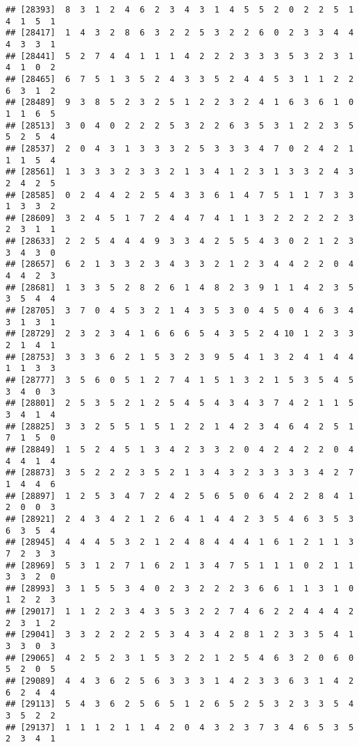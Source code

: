 \documentclass[
]{article}
\begin{document}
\begin{verbatim}
## [28393]  8  3  1  2  4  6  2  3  4  3  1  4  5  5  2  0  2  2  5  1  4  1  5  1
## [28417]  1  4  3  2  8  6  3  2  2  5  3  2  2  6  0  2  3  3  4  4  4  3  3  1
## [28441]  5  2  7  4  4  1  1  1  4  2  2  2  3  3  3  5  3  2  3  1  4  1  0  2
## [28465]  6  7  5  1  3  5  2  4  3  3  5  2  4  4  5  3  1  1  2  2  6  3  1  2
## [28489]  9  3  8  5  2  3  2  5  1  2  2  3  2  4  1  6  3  6  1  0  1  1  6  5
## [28513]  3  0  4  0  2  2  2  5  3  2  2  6  3  5  3  1  2  2  3  5  5  2  5  4
## [28537]  2  0  4  3  1  3  3  3  2  5  3  3  3  4  7  0  2  4  2  1  1  1  5  4
## [28561]  1  3  3  3  2  3  3  2  1  3  4  1  2  3  1  3  3  2  4  3  2  4  2  5
## [28585]  0  2  4  4  2  2  5  4  3  3  6  1  4  7  5  1  1  7  3  3  1  3  3  2
## [28609]  3  2  4  5  1  7  2  4  4  7  4  1  1  3  2  2  2  2  2  3  2  3  1  1
## [28633]  2  2  5  4  4  4  9  3  3  4  2  5  5  4  3  0  2  1  2  3  3  4  3  0
## [28657]  6  2  1  3  3  2  3  4  3  3  2  1  2  3  4  4  2  2  0  4  4  4  2  3
## [28681]  1  3  3  5  2  8  2  6  1  4  8  2  3  9  1  1  4  2  3  5  3  5  4  4
## [28705]  3  7  0  4  5  3  2  1  4  3  5  3  0  4  5  0  4  6  3  4  3  1  3  1
## [28729]  2  3  2  3  4  1  6  6  6  5  4  3  5  2  4 10  1  2  3  3  2  1  4  1
## [28753]  3  3  3  6  2  1  5  3  2  3  9  5  4  1  3  2  4  1  4  4  1  1  3  3
## [28777]  3  5  6  0  5  1  2  7  4  1  5  1  3  2  1  5  3  5  4  5  3  4  0  3
## [28801]  2  5  3  5  2  1  2  5  4  5  4  3  4  3  7  4  2  1  1  5  3  4  1  4
## [28825]  3  3  2  5  5  1  5  1  2  2  1  4  2  3  4  6  4  2  5  1  7  1  5  0
## [28849]  1  5  2  4  5  1  3  4  2  3  3  2  0  4  2  4  2  2  0  4  4  4  1  4
## [28873]  3  5  2  2  2  3  5  2  1  3  4  3  2  3  3  3  3  4  2  7  1  4  4  6
## [28897]  1  2  5  3  4  7  2  4  2  5  6  5  0  6  4  2  2  8  4  1  2  0  0  3
## [28921]  2  4  3  4  2  1  2  6  4  1  4  4  2  3  5  4  6  3  5  3  6  3  5  4
## [28945]  4  4  4  5  3  2  1  2  4  8  4  4  4  1  6  1  2  1  1  3  7  2  3  3
## [28969]  5  3  1  2  7  1  6  2  1  3  4  7  5  1  1  1  0  2  1  1  3  3  2  0
## [28993]  3  1  5  5  3  4  0  2  3  2  2  2  3  6  6  1  1  3  1  0  1  2  2  3
## [29017]  1  1  2  2  3  4  3  5  3  2  2  7  4  6  2  2  4  4  4  2  2  3  1  2
## [29041]  3  3  2  2  2  2  5  3  4  3  4  2  8  1  2  3  3  5  4  1  3  3  0  3
## [29065]  4  2  5  2  3  1  5  3  2  2  1  2  5  4  6  3  2  0  6  0  5  2  0  5
## [29089]  4  4  3  6  2  5  6  3  3  3  1  4  2  3  3  6  3  1  4  2  6  2  4  4
## [29113]  5  4  3  6  2  5  6  5  1  2  6  5  2  5  3  2  3  3  5  4  3  5  2  2
## [29137]  1  1  1  2  1  1  4  2  0  4  3  2  3  7  3  4  6  5  3  5  2  3  4  1

\end{verbatim}
\end{document}
